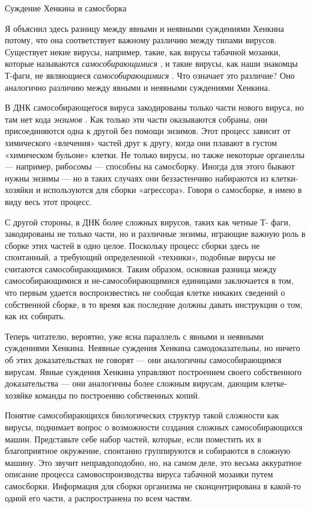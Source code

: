 Суждение Хенкина и самосборка

Я объяснил здесь разницу между явными и неявными суждениями Хенкина потому, что она соответствует важному различию между типами вирусов. Существует некие вирусы, например, такие, как вирусы табачной мозаики, которые называются \emph{самособирающимися} , и такие вирусы, как наши знакомцы Т-фаги, не являющиеся \emph{самособирающимися} . Что означает это различие? Оно аналогично различию между явными и неявными суждениями Хенкина.

В ДНК самособирающегося вируса закодированы только части нового вируса, но там нет кода \emph{энзимов} . Как только эти части оказываются собраны, они присоединяются одна к другой без помощи энзимов. Этот процесс зависит от химического «влечения» частей друг к другу, когда они плавают в густом «химическом бульоне» клетки. Не только вирусы, но также некоторые органеллы --- например, рибосомы --- способны на самосборку. Иногда для этого бывают нужны энзимы --- но в таких случаях они беззастенчиво набираются из клетки-хозяйки и используются для сборки «агрессора». Говоря о самосборке, я имею в виду весь этот процесс.

С другой стороны, в ДНК более сложных вирусов, таких как четные Т- фаги, закодированы не только части, но и различные энзимы, играющие важную роль в сборке этих частей в одно целое. Поскольку процесс сборки здесь не спонтанный, а требующий определенной «техники», подобные вирусы не считаются самособирающимися. Таким образом, основная разница между самособирающимися и не-самособирающимися единицами заключается в том, что первым удается воспроизвестись не сообщая клетке никаких сведений о собственной сборке, в то время как последние должны давать инструкции о том, как их собирать.

Теперь читателю, вероятно, уже ясна параллель с явными и неявными суждениями Хенкина. Неявные суждения Хенкина самодоказательны, но ничего об этих доказательствах не говорят --- они аналогичны самособирающимся вирусам. Явные суждения Хенкина управляют построением своего собственного доказательства --- они аналогичны более сложным вирусам, дающим клетке-хозяйке команды по построению собственных копий.

Понятие самособирающихся биологических структур такой сложности как вирусы, поднимает вопрос о возможности создания сложных самособирающихся машин. Представьте себе набор частей, которые, если поместить их в благоприятное окружение, спонтанно группируются и собираются в сложную машину. Это звучит неправдоподобно, но, на самом деле, это весьма аккуратное описание процесса самовоспроизводства вируса табачной мозаики путем самосборки. Информация для сборки организма не сконцентрирована в какой-то одной его части, а распространена по всем частям.

